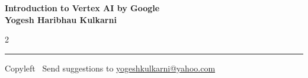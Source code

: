 \documentclass[8pt,landscape]{article}
\begin{document}
\footnotesize


\begin{center}
\Large{\textbf{Introduction to Vertex AI by Google\\ Yogesh Haribhau Kulkarni}}  
\end{center}

\begin{multicols}{2}

\end{multicols}

\rule{\linewidth}{0.25pt}
\scriptsize
Copyleft \textcopyleft\  Send suggestions to 
\href{http://www.yogeshkulkarni.com}{yogeshkulkarni@yahoo.com}
\end{document}
